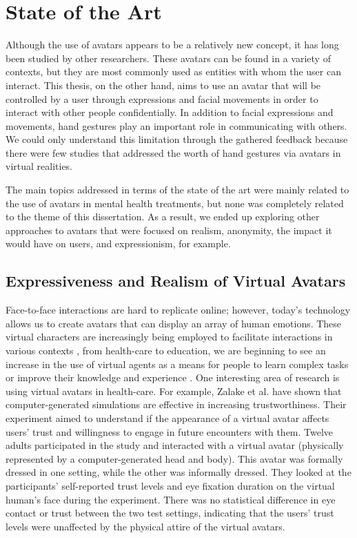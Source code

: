 \section{State of the Art}
Although the use of avatars appears to be a relatively new concept, it has long been studied by other researchers. These avatars can be found in a variety of contexts, but they are most commonly used as entities with whom the user can interact. This thesis, on the other hand, aims to use an avatar that will be controlled by a user through expressions and facial movements in order to interact with other people confidentially. In addition to facial expressions and movements, hand gestures play an important role in communicating with others. We could only understand this limitation through the gathered feedback because there were few studies that addressed the worth of hand gestures via avatars in virtual realities.

The main topics addressed in terms of the state of the art were mainly related to the use of avatars in mental health treatments, but none was completely related to the theme of this dissertation. As a result, we ended up exploring other approaches to avatars that were focused on realism, anonymity, the impact it would have on users, and expressionism, for example.

\subsection{Expressiveness and Realism of Virtual Avatars}
Face-to-face interactions are hard to replicate online; however, today's technology allows us to create avatars that can display an array of human emotions. These virtual characters are increasingly being employed to facilitate interactions in various contexts \cite{NOW18}, from health-care to education, we are beginning to see an increase in the use of virtual agents as a means for people to learn complex tasks or improve their knowledge and experience \cite{MAR18, SHO19}. One interesting area of research is using virtual avatars in health-care. For example, Zalake et al. \cite{ZAL18} have shown that computer-generated simulations are effective in increasing trustworthiness. Their experiment aimed to understand if the appearance of a virtual avatar affects users' trust and willingness to engage in future encounters with them. Twelve adults participated in the study and interacted with a virtual avatar (physically represented by a computer-generated head and body). This avatar was formally dressed in one setting, while the other was informally dressed. They looked at the participants' self-reported trust levels and eye fixation duration on the virtual human's face during the experiment. There was no statistical difference in eye contact or trust between the two test settings, indicating that the users' trust levels were unaffected by the physical attire of the virtual avatars.

